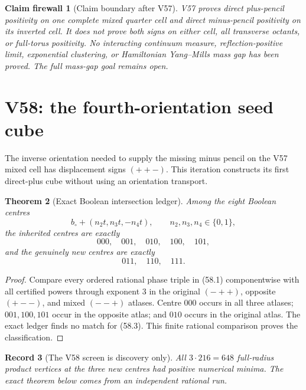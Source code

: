\documentclass[11pt,oneside]{article}
\newtheorem{theorem}{Theorem}[section]
\newtheorem{firewall}[theorem]{Claim firewall}
\newtheorem{record}[theorem]{Record}
\theoremstyle{definition}
\theoremstyle{remark}
\begin{document}
\begin{firewall}[Claim boundary after V57]
\label{fire:newv57-final}
V57 proves direct plus-pencil positivity on one complete mixed
quarter cell and direct minus-pencil positivity on its inverted
cell.  It does not prove both signs on either cell, all transverse
octants, or full-torus positivity.  No interacting continuum
measure, reflection-positive limit, exponential clustering, or
Hamiltonian Yang--Mills mass gap has been proved.  The full
mass-gap goal remains open.
\end{firewall}

\section{V58: the fourth-orientation seed cube}
\label{sec:newv58-fourth-seed}

The inverse orientation needed to supply the missing minus pencil
on the V57 mixed cell has displacement signs \((++-)\).  This
iteration constructs its first direct-plus cube without using an
orientation transport.

\begin{theorem}[Exact Boolean intersection ledger]
\label{thm:newv58-intersections}
Among the eight Boolean centres
\[
 b_\circ+(n_2t,n_3t,-n_4t),\qquad n_2,n_3,n_4\in\{0,1\}, \tag{58.1}
\]
the inherited centres are exactly
\[
 000,\quad001,\quad010,\quad100,\quad101,             \tag{58.2}
\]
and the genuinely new centres are exactly
\[
 011,\quad110,\quad111.                               \tag{58.3}
\]
\end{theorem}

\begin{proof}
Compare every ordered rational phase triple in (58.1)
componentwise with all certified powers through exponent \(3\) in
the original \((-++)\), opposite \((+--)\), and mixed \((--+)\)
atlases.  Centre \(000\) occurs in all three atlases; \(001,100,101\)
occur in the opposite atlas; and \(010\) occurs in the original
atlas.  The exact ledger finds no match for (58.3).  This finite
rational comparison proves the classification.
\end{proof}

\begin{record}[The V58 screen is discovery only]
\label{rec:newv58-screen}
All \(3\cdot216=648\) full-radius product vertices at the three new
centres had positive numerical minima.  The exact theorem below
comes from an independent rational run.
\end{record}
\end{document}
